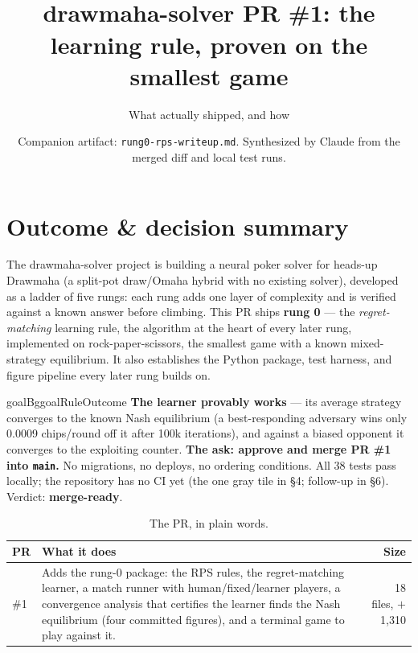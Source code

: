 \documentclass[11pt]{article}
\title{\vspace{-1.2cm}{\color{blueaccent}\textbf{Rung 0: RPS Regret Matching --- Post-PR Writeup}}\\[2pt]
  \large\normalfont\color{softgray} drawmaha-solver PR \#1: the learning rule, proven on the smallest game}
\author{\normalsize\color{softgray} What actually shipped, and how}
\date{\normalsize\small\color{softgray} Companion artifact: \texttt{rung0-rps-writeup.md}. Synthesized by Claude from the merged diff and local test runs.}
\newenvironment{goal}{\begin{calloutbox}{goalBg}{goalRule}{Outcome}}{\end{calloutbox}}
\begin{document}
\maketitle
\vspace{-0.7cm}

\section{Outcome \& decision summary}

\noindent The drawmaha-solver project is building a neural poker solver for
heads-up Drawmaha (a split-pot draw/Omaha hybrid with no existing solver),
developed as a ladder of five rungs: each rung adds one layer of complexity and
is verified against a known answer before climbing. This PR ships \textbf{rung
0} --- the \emph{regret-matching} learning rule, the algorithm at the heart of
every later rung, implemented on rock-paper-scissors, the smallest game with a
known mixed-strategy equilibrium. It also establishes the Python package, test
harness, and figure pipeline every later rung builds on.

\begin{goal}
\textbf{The learner provably works} --- its average strategy converges to the
known Nash equilibrium (a best-responding adversary wins only 0.0009
chips/round off it after 100k iterations), and against a biased opponent it
converges to the exploiting counter. \textbf{The ask: approve and merge PR \#1
into \texttt{main}.} No migrations, no deploys, no ordering conditions. All 38
tests pass locally; the repository has no CI yet (the one gray tile in \S4;
follow-up in \S6). Verdict: \textbf{merge-ready}.
\end{goal}

\begin{table}[H]
\centering\small
\caption{The PR, in plain words.}
\renewcommand{\arraystretch}{1.25}
\begin{tabular}{@{}lp{9.9cm}r@{}}
\toprule
PR & What it does & Size \\
\midrule
\#1 & Adds the rung-0 package: the RPS rules, the regret-matching learner, a
      match runner with human/fixed/learner players, a convergence analysis
      that certifies the learner finds the Nash equilibrium (four committed
      figures), and a terminal game to play against it. & 18 files, $+$1,310 \\
\bottomrule
\end{tabular}
\end{table}
\end{document}
